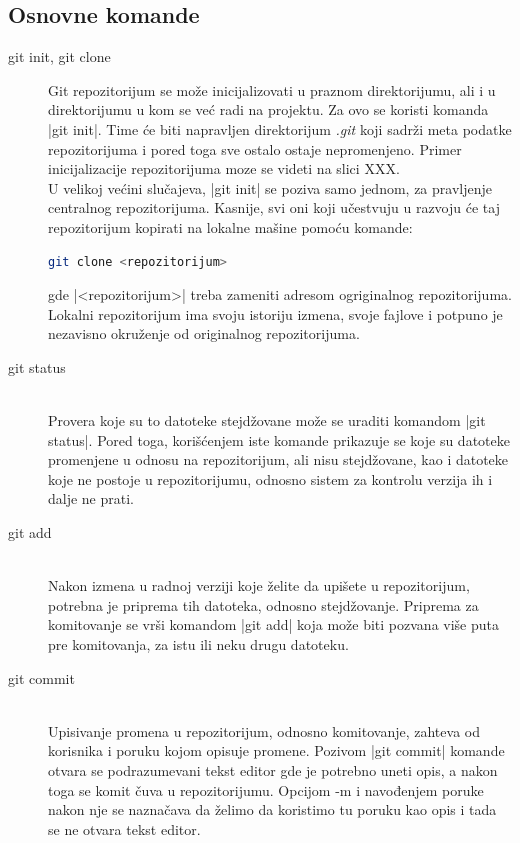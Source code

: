 \documentclass[a4paper]{article}
\begin{document}
{\subsection{Osnovne komande}
\label{osnovne_komande}


\begin{description}

\item[git init, git clone] \hfill

Git repozitorijum se može inicijalizovati u praznom direktorijumu, ali i u direktorijumu u kom se već radi na projektu. Za ovo se koristi komanda |git init|. Time će biti napravljen direktorijum \textit{.git} koji sadrži meta podatke repozitorijuma i pored toga sve ostalo ostaje nepromenjeno. Primer inicijalizacije repozitorijuma moze se videti na slici XXX.\\

U velikoj većini slučajeva, |git init| se poziva samo jednom, za pravljenje centralnog repozitorijuma. Kasnije, svi oni koji učestvuju u razvoju će taj repozitorijum kopirati na lokalne mašine pomoću komande:
\begin{lstlisting}[language=bash]
git clone <repozitorijum>
\end{lstlisting}

gde |<repozitorijum>| treba zameniti adresom ogriginalnog repozitorijuma. Lokalni repozitorijum ima svoju istoriju izmena, svoje fajlove i potpuno je nezavisno okruženje od originalnog repozitorijuma. 


\item[git status] \hfill \\
\label{subsec:git_status}
Provera koje su to datoteke stejdžovane može se uraditi komandom |git status|. Pored toga, korišćenjem iste komande prikazuje se koje su datoteke promenjene u odnosu na repozitorijum, ali nisu stejdžovane, kao i datoteke koje ne postoje u repozitorijumu, odnosno sistem za kontrolu verzija ih i dalje ne prati.

\item[git add] \hfill \\
\label{subsec:git_add}
Nakon izmena u radnoj verziji koje želite da upišete u repozitorijum, potrebna je priprema tih datoteka, odnosno stejdžovanje. Priprema za komitovanje se vrši komandom |git add| koja može biti pozvana više puta pre komitovanja, za istu ili neku drugu datoteku.


\item[git commit] \hfill \\
\label{subsec:git_commit}
Upisivanje promena u repozitorijum, odnosno komitovanje, zahteva od korisnika i poruku kojom opisuje promene. Pozivom |git commit| komande otvara se podrazumevani tekst editor gde je potrebno uneti opis, a nakon toga se komit čuva u repozitorijumu. Opcijom -m i navođenjem poruke nakon nje se naznačava da želimo da koristimo tu poruku kao opis i tada se ne otvara tekst editor.\\


\end{description}}
\end{document}
